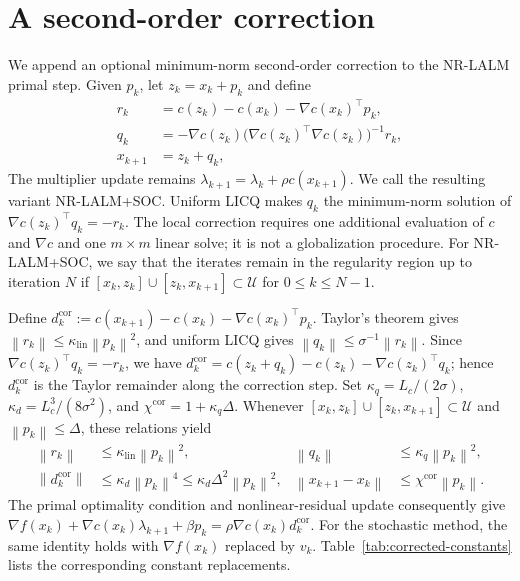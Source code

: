 \documentclass[11pt]{article}
\theoremstyle{definition}
\theoremstyle{remark}
\numberwithin{equation}{section}
\numberwithin{figure}{section}
\numberwithin{table}{section}
\numberwithin{algorithm}{section}
\newcommand{\norm}[1]{\left\lVert #1\right\rVert}
\newcommand{\grad}{\nabla}
\begin{document}
\section{A second-order correction}
\label{sec:correction}

We append an optional minimum-norm second-order correction to the NR-LALM primal step.  Given $p_k$, let $z_k=x_k+p_k$ and define
\begin{equation}
\begin{aligned}
r_k&=c(z_k)-c(x_k)-\grad c(x_k)^\top p_k,\\
q_k&=-\grad c(z_k)
\big(\grad c(z_k)^\top\grad c(z_k)\big)^{-1}r_k,\\
x_{k+1}&=z_k+q_k,
\end{aligned}
\label{eq:correctionstep}
\end{equation}
The multiplier update remains $\lambda_{k+1}=\lambda_k+\rho c(x_{k+1})$.  We call the resulting variant NR-LALM+SOC.  Uniform LICQ makes $q_k$ the minimum-norm solution of $\grad c(z_k)^\top q_k=-r_k$.  The local correction requires one additional evaluation of $c$ and $\grad c$ and one $m\times m$ linear solve; it is not a
globalization procedure. For NR-LALM+SOC, we say that the iterates remain in the regularity region up to iteration $N$ if $[x_k,z_k]\cup[z_k,x_{k+1}]\subset\mathcal U$ for $0\le k\le N-1$.

Define $d_k^{\mathrm{cor}} :=c(x_{k+1})-c(x_k)-\grad c(x_k)^\top p_k$.  Taylor's theorem gives $\norm{r_k}\le\kappa_{\mathrm{lin}}\norm{p_k}^2$, and uniform LICQ gives $\norm{q_k}\le\sigma^{-1}\norm{r_k}$.  Since
$\grad c(z_k)^\top q_k=-r_k$, we have $d_k^{\mathrm{cor}}=c(z_k+q_k)-c(z_k)-\grad c(z_k)^\top q_k$; hence
$d_k^{\mathrm{cor}}$ is the Taylor remainder along the correction step.  Set $\kappa_q=L_c/(2\sigma)$, $\kappa_d=L_c^3/(8\sigma^2)$, and $\chi^{\mathrm{cor}}=1+\kappa_q\Delta$. Whenever $[x_k,z_k]\cup[z_k,x_{k+1}]\subset\mathcal U$ and $\norm{p_k}\le\Delta$, these relations yield
\begin{equation}
\begin{aligned}
 \norm{r_k}&\le\kappa_{\mathrm{lin}}\norm{p_k}^2,&
 \norm{q_k}&\le\kappa_q\norm{p_k}^2,\\
 \norm{d_k^{\mathrm{cor}}}
 &\le\kappa_d\norm{p_k}^4
 \le\kappa_d\Delta^2\norm{p_k}^2,&
 \norm{x_{k+1}-x_k}
 &\le\chi^{\mathrm{cor}}\norm{p_k}.
\end{aligned}
\label{eq:corrected-error-bounds}
\end{equation}
The primal optimality condition and nonlinear-residual update consequently give
$\grad f(x_k)+\grad c(x_k)\lambda_{k+1}+\beta p_k
=\rho\grad c(x_k)d_k^{\mathrm{cor}}$.  For the stochastic method, the same
identity holds with $\grad f(x_k)$ replaced by $v_k$.  Table~\ref{tab:corrected-constants}
lists the corresponding constant replacements.
\end{document}
